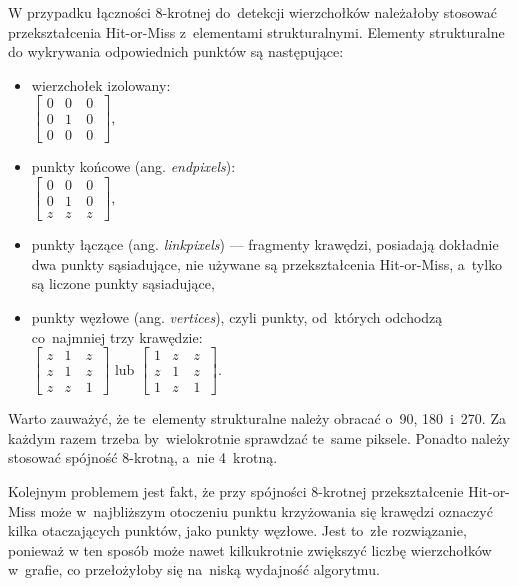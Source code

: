 \documentclass[a4paper,11pt,twoside,openright]{report}
\theoremstyle{definition}
\begin{document}
W przypadku łączności 8-krotnej do~detekcji wierzchołków należałoby stosować
przekształcenia Hit-or-Miss z~elementami strukturalnymi. Elementy strukturalne
do wykrywania odpowiednich punktów są następujące:

\begin{itemize}%
\item wierzchołek izolowany: \\
$
\begin{bmatrix}
0 & 0~& 0~\\
0 & 1~& 0~\\
0 & 0~& 0
\end{bmatrix}
$,
\item punkty końcowe (ang. \textit{endpixels}): \\
$
\begin{bmatrix}
0 & 0~& 0~\\
0 & 1~& 0~\\
z & z~& z
\end{bmatrix}
$,
\item punkty łączące (ang. \textit{linkpixels}) --- fragmenty krawędzi, posiadają
dokładnie dwa punkty sąsiadujące, nie używane są przekształcenia Hit-or-Miss, a~tylko są liczone punkty sąsiadujące,
\item punkty węzłowe (ang. \textit{vertices}), czyli punkty, od~których odchodzą co~najmniej trzy krawędzie: \\
$
\begin{bmatrix}
z & 1~& z~\\
z & 1~& z~\\
z & z~& 1
\end{bmatrix}
$ lub $
\begin{bmatrix}
1 & z~& z~\\
z & 1~& z~\\
1 & z~& 1
\end{bmatrix}
$.
\end{itemize}

Warto zauważyć, że te~elementy strukturalne należy obracać o~90\textdegree, 180\textdegree~i~270\textdegree.
Za każdym razem trzeba by~wielokrotnie sprawdzać te~same piksele. Ponadto należy
stosować spójność 8-krotną, a~nie 4~krotną.

Kolejnym problemem jest fakt, że przy spójności 8-krotnej przekształcenie
Hit-or-Miss może w~najbliższym otoczeniu punktu krzyżowania się krawędzi oznaczyć
kilka otaczających punktów, jako punkty węzłowe. Jest to~złe rozwiązanie, ponieważ
w ten sposób może nawet kilkukrotnie zwiększyć liczbę wierzchołków w~grafie, co
przełożyłoby się na~niską wydajność algorytmu.
\end{document}
